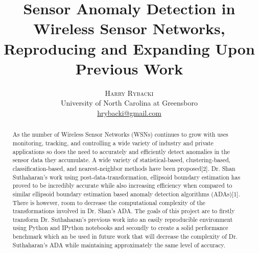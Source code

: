 \documentclass[twoside]{article}
\title{\vspace{-15mm}\fontsize{24pt}{10pt}\selectfont\textbf{Sensor Anomaly Detection in Wireless Sensor Networks, Reproducing and Expanding Upon Previous Work}} %
\author{
\large
\textsc{Harry Rybacki}\\[2mm] %
\normalsize University of North Carolina at Greensboro \\ %
\normalsize \href{mailto:hrybacki@gmail.com}{hrybacki@gmail.com} %
\vspace{-5mm}
}
\date{}
\begin{document}
\maketitle %

\thispagestyle{fancy} %


\begin{abstract}

\noindent As the number of Wireless Sensor Networks (WSNs) continues to grow with uses monitoring, tracking, and controlling a wide variety of industry and private applications so does the need to accurately and efficiently detect anomalies in the sensor data they accumulate. A wide variety of statistical-based, clustering-based, classification-based, and nearest-neighbor methods have been proposed[2]. Dr. Shan Suthaharan's work using post-data-transformation, ellipsoid boundary estimation has proved to be incredibly accurate while also increasing efficiency when compared to similar ellipsoid boundary estimation based anomaly detection algorithms (ADAs)[1]. There is however, room to decrease the computational complexity of the transformations involved in Dr. Shan's ADA. The goals of this project are to firstly transform Dr. Suthaharan's previous work into an easily reproducible environment using Python and IPython notebooks and secondly to create a solid performance benchmark which an be used in future work that will decrease the complexity of Dr. Suthaharan's ADA while maintaining approximately the same level of accuracy.

\end{abstract}

\end{document}
